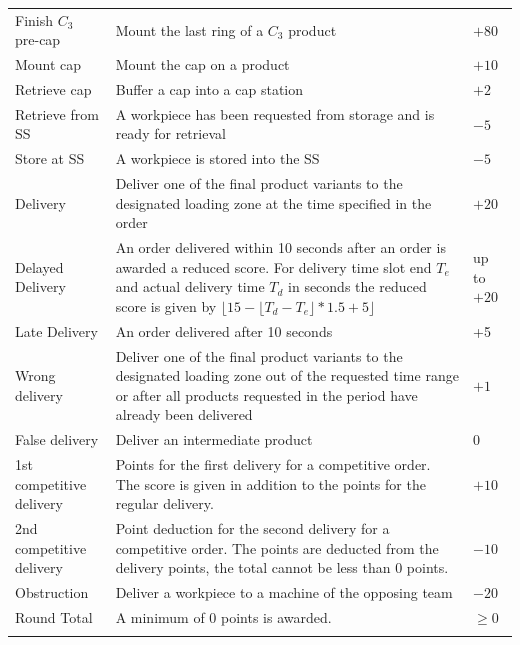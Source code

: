 \documentclass[12pt,twoside]{article}
\begin{document}
\begin{longtable}{p{}
    |p{}
    |p{}}
        Finish $C_3$ pre-cap & Mount the last ring of a $C_3$ product & $+80$
        \\
        Mount cap & Mount the cap on a product & $+10$
        \\
        Retrieve cap & Buffer a cap into a cap station & $+2$
        \\
        Retrieve from SS
        & A workpiece has been requested from storage and is ready for retrieval
        & $-5$
        \\
        Store at SS
        & A workpiece is stored into the SS
        & $-5$
        \\
        Delivery
        & Deliver one of the final product variants to the designated loading
        zone at the time specified in the order
        & $+20$
        \\
        Delayed Delivery & An order delivered within 10 seconds after an order
        is awarded a reduced score. For delivery time slot end $T_e$ and actual
        delivery time $T_d$ in seconds the reduced score is given by \newline
        $\lfloor 15 - \lfloor T_d - T_e \rfloor * 1.5 + 5 \rfloor$
        & up to $+20$
        \\
        Late Delivery & An order delivered after 10 seconds & +5 \\
        Wrong delivery & Deliver one of the final product variants to
        the designated loading zone out of the requested time range or
        after all products requested in the period have already been
        delivered
        & $+1$
        \\
        False delivery & Deliver an intermediate product & $0$
        \\
        1st competitive delivery
        & Points for the first delivery for a competitive order. The score is
        given in addition to the points for the regular delivery.
        &$+ 10$
        \\
        2nd competitive delivery
        & Point deduction for the second delivery for a competitive order. The
        points are deducted from the delivery points, the total cannot be less
        than 0 points.
        &$- 10$
        \\
        Obstruction
        & Deliver a workpiece to a machine of the opposing team
        & $-20$
        \\
        \hline
      Round Total & A minimum of 0 points is awarded. & $\geq 0$ \\
          \hhline{===}

\end{longtable}
\end{document}

